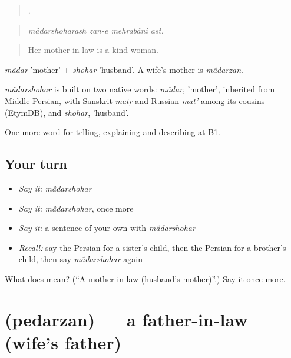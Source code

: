 \begin{quote}
   .
\end{quote}

\begin{quote}
\emph{mâdarshoharash zan-e mehrabâni ast.}
\end{quote}

\begin{quote}
Her mother-in-law is a kind woman.
\end{quote}

\emph{mâdar} 'mother' + \emph{shohar} 'husband'. A wife's mother is \emph{mâdarzan}.

\begin{cousinweb}
\emph{mâdarshohar} is built on two native words: \emph{mâdar}, 'mother', inherited from Middle Persian, with Sanskrit \emph{mātṛ} and Russian \emph{mat'} among its cousins (EtymDB), and \emph{shohar}, 'husband'.
\end{cousinweb}

\begin{grammarlens}[title={What you've built}]
One more word for telling, explaining and describing at B1.
\end{grammarlens}

\subsection*{Your turn}
\begin{itemize}
\raggedright
  \item \emph{Say it:} \emph{mâdarshohar}
  \item \emph{Say it:} \emph{mâdarshohar}, once more
  \item \emph{Say it:} a sentence of your own with \emph{mâdarshohar}
  \item \emph{Recall:} say the Persian for a sister's child, then the Persian for a brother's child, then say \emph{mâdarshohar} again
\end{itemize}

\begin{tcolorbox}[breakable,colback=teal!4,colframe=teal!35!black,title={Before you move on}]
What does  mean? (\textquotedblleft{}A mother-in-law (husband's mother)\textquotedblright{}.) Say it once more.
\end{tcolorbox}
\section[\texorpdfstring{\fa{پدرزن} (pedarzan)}{پدرزن (pedarzan)}]{ (pedarzan) — a father-in-law (wife's father)}

